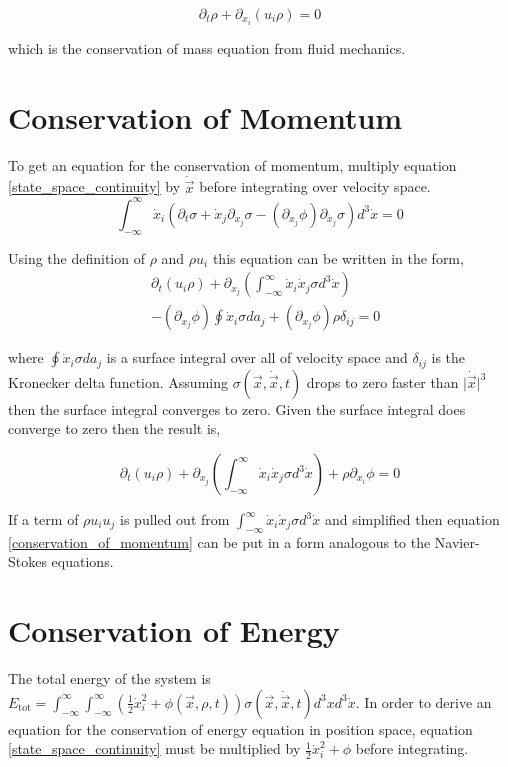 \documentclass[%
 twocolumn,
 amsmath,amssymb,
 aps,
]{revtex4-1}
\newcommand{\dvec}[1]{\dot{\vec{#1}}}
\newcommand{\intVdot}[1]{\int_{-\infty}^{\infty} #1 d^3\dot{x}}
\newcommand{\intVVdot}[1]{\int_{-\infty}^{\infty}\int_{-\infty}^{\infty} #1 d^3xd^3\dot{x}}
\begin{document}
\begin{equation}
\partial_t\rho + \partial_{x_i}\left(u_i\rho\right)=0
\label{conservation_of_mass}
\end{equation}

which is the conservation of mass equation from fluid mechanics.

\section{Conservation of Momentum}
To get an equation for the conservation of momentum, multiply equation \eqref{state_space_continuity} by $\dvec{x}$ before integrating over velocity space.
\[
\intVdot{\dot{x}_i\left(\partial_t \sigma + \dot{x}_j\partial_{x_j}\sigma-\left(\partial_{x_j}\phi\right)\partial_{\dot{x}_j}\sigma\right)}=0
\]

Using the definition of $\rho$ and $\rho u_i$ this equation can be written in the form,
\[
\begin{split}
& \partial_t\left(u_i\rho\right) + \partial_{x_j}\left(\intVdot{\dot{x}_i\dot{x}_j\sigma}\right) \\ & - \left(\partial_{x_j}\phi\right)\oint\dot{x}_i\sigma da_j + \left(\partial_{x_j}\phi\right)\rho\delta_{i j}=0
\end{split}
\]

where $\oint\dot{x}_i\sigma da_j$ is a surface integral over all of velocity space and $\delta_{ij}$ is the Kronecker delta function. Assuming $\sigma(\vec{x}, \dvec{x}, t)$ drops to zero faster than $\lvert\dvec{x}\rvert^3$ then the surface integral converges to zero. Given the surface integral does converge to zero then the result is,

\begin{equation}
\partial_t\left(u_i\rho\right) + \partial_{x_j}\left(\intVdot{\dot{x}_i\dot{x}_j\sigma}\right) + \rho\partial_{x_i}\phi=0
\label{conservation_of_momentum}
\end{equation}

If a term of $\rho u_i u_j$ is pulled out from $\intVdot{\dot{x}_i\dot{x}_j\sigma}$ and simplified then equation \eqref{conservation_of_momentum} can be put in a form analogous to the Navier-Stokes equations.

\section{Conservation of Energy}
The total energy of the system is $E_{\text{tot}}=\intVVdot{\left(\frac{1}{2}\dot{x}_i^2 + \phi(\vec{x}, \rho, t)\right)\sigma(\vec{x}, \dvec{x}, t)}$. In order to derive an equation for the conservation of energy equation in position space, equation \eqref{state_space_continuity} must be multiplied by $\frac{1}{2}\dot{x}_i^2 + \phi$ before integrating. 
\end{document}
